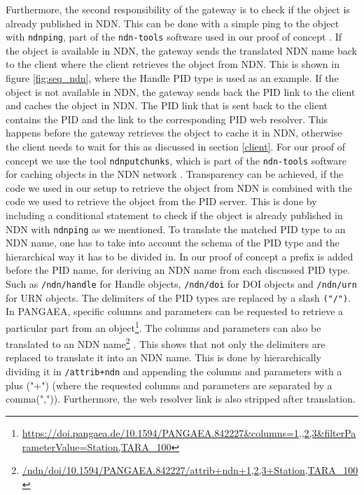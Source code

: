 Furthermore, the second responsibility of the gateway is to check if the object is already published in NDN.  This can be done with a simple ping to the object with \texttt{ndnping}, part of the \texttt{ndn-tools} software used in our proof of concept \cite{ndn-tools}. 
If the object is available in NDN, the gateway sends the translated NDN name back to the client where the client retrieves the object from NDN. This is shown in figure \ref{fig:seq_ndn}, where the Handle PID type is used as an example. If the object is not available in NDN, the gateway sends back the PID link to the client and caches the object in NDN. 
The PID link that is sent back to the client contains the PID and the link to the corresponding PID web resolver. This happens before the gateway retrieves the object to cache it in NDN, otherwise the client needs to wait for this as discussed in section \ref{client}. For our proof of concept we use the tool \texttt{ndnputchunks}, which is part of the \texttt{ndn-tools} software for caching objects in the NDN network \cite{ndn-tools}. Transparency can be achieved, if the code we used in our setup to retrieve the object from NDN is combined with the code we used to retrieve the object from the PID server. This is done by including a conditional statement to check if the object is already published in NDN with \texttt{ndnping} as we mentioned. 
To translate the matched PID type to an NDN name, one has to take into account the schema of the PID type and the hierarchical way it has to be divided in. In our proof of concept a prefix is added before the PID name, for deriving an NDN name from each discussed PID type. Such as \texttt{/ndn/handle} for Handle objects, \texttt{/ndn/doi} for DOI objects and \texttt{/ndn/urn} for URN objects. The delimiters of the PID types are replaced by a slash \texttt{("/")}. In PANGAEA, specific columns and parameters can be requested to retrieve a particular part from an object\footnote{\url{https://doi.pangaea.de/10.1594/PANGAEA.842227&columns=1,,2,3&filterParameterValue=Station,TARA_100}}. The columns and parameters can also be translated to an NDN name\footnote{\url{/ndn/doi/10.1594/PANGAEA.842227/attrib+ndn+1,2,3+Station,TARA_100}} \cite{ndn-app-aware}. This shows that not only the delimiters are replaced to translate it into an NDN name. This is done by hierarchically dividing it in \texttt{/attrib+ndn} and appending the columns and parameters with a plus ("+") (where the requested columns and parameters are separated by a comma(",")). Furthermore, the web resolver link is also stripped after translation.

